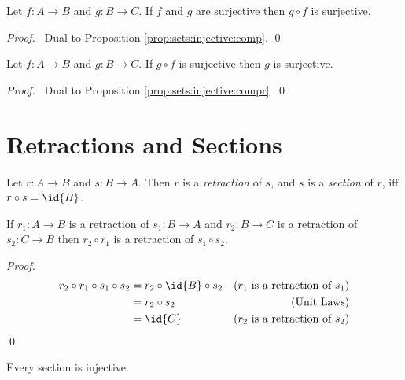 \begin{lm}
 Let $f : A \rightarrow B$ and $g : B \rightarrow C$. If $f$ and $g$ are
surjective then $g \circ f$ is surjective.
\end{lm}

\begin{proof}
 \pf\ Dual to Proposition \ref{prop:sets:injective:comp}. \qed
\end{proof}

\begin{lm}
 Let $f : A \rightarrow B$ and $g : B \rightarrow C$. If $g \circ f$ is
surjective then $g$ is surjective.
\end{lm}

\begin{proof}
 \pf\ Dual to Proposition \ref{prop:sets:injective:compr}. \qed
\end{proof}

\section{Retractions and Sections}

\begin{df}
  Let $r : A \rightarrow B$ and $s : B \rightarrow A$. Then $r$ is a
  \emph{retraction} of $s$, and $s$ is a \emph{section} of $r$, iff $r \circ
  s = \id{B}$.
\end{df}

\begin{prop}
\label{prop:sets:retraction:comp}
If $r_1 : A \rightarrow B$ is a retraction of $s_1 : B \rightarrow A$ and $r_2 : B \rightarrow C$ is a retraction of $s_2 : C \rightarrow B$ then $r_2 \circ r_1$ is a retraction of $s_1 \circ s_2$.
\end{prop}

\begin{proof}
\pf
\begin{align*}
r_2 \circ r_1 \circ s_1 \circ s_2 & = r_2 \circ \id{B} \circ s_2 & (\text{$r_1$ is a retraction of $s_1$}) \\
& = r_2 \circ s_2 & (\text{Unit Laws}) \\
& = \id{C} & (\text{$r_2$ is a retraction of $s_2$})
\end{align*}
\qed
\end{proof}

\begin{prop}
\label{prop:sets:section:injective}
Every section is injective.
\end{prop}

